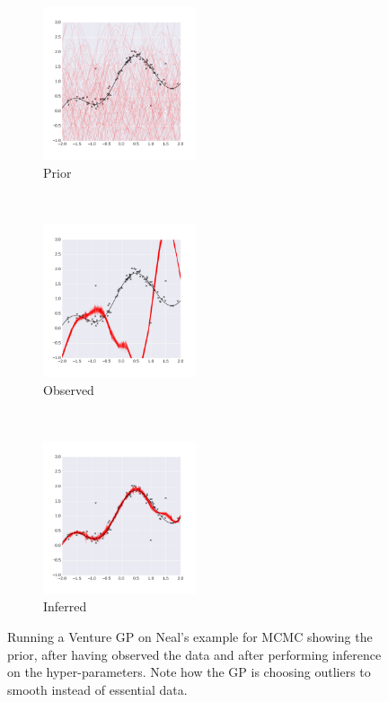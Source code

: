 \documentclass{article} %
\begin{document}
\begin{figure}
        \centering
        \begin{subfigure}[b]{0.3\textwidth} \centering
                \includegraphics[height=4.5cm]{figs/neal_se_1a.png}
                \caption{Prior}
                \label{fig:NealBO}
        \end{subfigure}%
        ~ %
        \begin{subfigure}[b]{0.3\textwidth} \centering
                \includegraphics[height=4.5cm]{figs/neal_se_2a.png}
                \caption{Observed}
                \label{fig:NealAO))}
        \end{subfigure}
        ~ %
        \begin{subfigure}[b]{0.3\textwidth} \centering
                \includegraphics[height=4.5cm]{figs/neal_se_3a.png}
                \caption{Inferred}
                \label{fig:NealAI}
        \end{subfigure}
        \caption{Running a Venture GP on Neal's example for MCMC showing the prior, after having observed the data and after performing inference on the hyper-parameters. Note how the GP is choosing outliers to smooth instead of essential data. }\label{fig:neal}
\end{figure}
\end{document}
